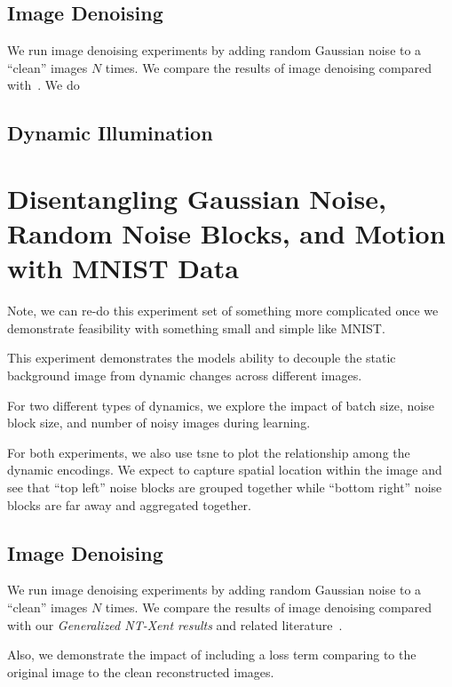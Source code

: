 \documentclass[11pt]{article}
\begin{document}
\subsection{Image Denoising}\label{subsec:gnt_xent_denoising}

We run image denoising experiments by adding random Gaussian noise to a ``clean'' images $N$ times. We compare the results of image denoising compared with~\cite{xia2019training,metzler2016denoising,li2013efficient}. We do 

\subsection{Dynamic Illumination}\label{subsec:gnt_xent_illumination}

\section{Disentangling Gaussian Noise, Random Noise Blocks, and Motion with MNIST Data}\label{sec:disent_mnist}

Note, we can re-do this experiment set of something more complicated once we demonstrate feasibility with something small and simple like MNIST.

This experiment demonstrates the models ability to decouple the static background image from dynamic changes across different images.

For two different types of dynamics, we explore the impact of batch size, noise block size, and number of noisy images during learning.

For both experiments, we also use tsne to plot the relationship among the dynamic encodings. We expect to capture spatial location within the image and see that ``top left'' noise blocks are grouped together while ``bottom right'' noise blocks are far away and aggregated together.


\subsection{Image Denoising}\label{subsec:disent_mnist_denoising}

We run image denoising experiments by adding random Gaussian noise to a ``clean'' images $N$ times. We compare the results of image denoising compared with our \emph{Generalized NT-Xent results} and related literature~\cite{xia2019training,metzler2016denoising,li2013efficient}.

Also, we demonstrate the impact of including a loss term comparing to the original image to the clean reconstructed images.
\end{document}
